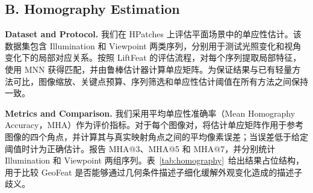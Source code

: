 \documentclass{article}
\begin{document}
\begin{table}[!t]
\centering
\caption{MegaDepth-1500 和 ScanNet-1500 上的相对位姿估计结果。报告 AUC@5$^\circ$、AUC@10$^\circ$ 和 AUC@20$^\circ$。对比方法数值引自 LiftFeat~\cite{LiftFeat}，GeoFeat 结果待实测。}
\label{tab:relative-pose}
\small
{}
\end{table}

\subsection{B. Homography Estimation}
\noindent\textbf{Dataset and Protocol.} 我们在 HPatches 上评估平面场景中的单应性估计。该数据集包含 Illumination 和 Viewpoint 两类序列，分别用于测试光照变化和视角变化下的局部对应关系。按照 LiftFeat 的评估流程，对每个序列提取局部特征，使用 MNN 获得匹配，并由鲁棒估计器计算单应矩阵。为保证结果与已有轻量方法可比，图像缩放、关键点预算、序列筛选和单应性估计阈值在所有方法之间保持一致。

\noindent\textbf{Metrics and Comparison.} 我们采用平均单应性准确率（Mean Homography Accuracy，MHA）作为评价指标。对于每个图像对，将估计单应矩阵作用于参考图像的四个角点，并计算其与真实映射角点之间的平均像素误差；当误差低于给定阈值时计为正确估计。报告 MHA@3、MHA@5 和 MHA@7，并分别统计 Illumination 和 Viewpoint 两组序列。表~\ref{tab:homography}~给出结果占位结构，用于比较 GeoFeat 是否能够通过几何条件描述子细化缓解外观变化造成的描述子歧义。
\end{document}
